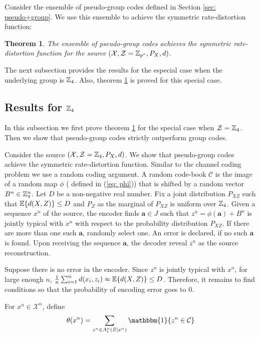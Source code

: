 \documentclass[conference]{IEEEtran}
\theoremstyle{plain}
\newtheorem{thm}{Theorem}
\theoremstyle{definition}
\theoremstyle{remark}
\begin{document}
Consider the ensemble of pseudo-group codes defined in Section \ref{sec: pseudo+group}. We use this ensemble to achieve the symmetric rate-distortion function:
\begin{thm}\label{thm: source coding pseudo group codes}
The ensemble of pseudo-group codes achieves the symmetric rate-distortion function for the source $(\mathcal{X},\mathcal{Z}=\mathbb{Z}_{p^r},P_X,d)$.
\end{thm}

The next subsection provides the results for the especial case when the underlying group is $\mathbb{Z}_4$. Also, theorem \ref{thm: source coding pseudo group codes} is proved for this special case.


\subsection{Results for $\mathbb{Z}_4$}
In this subsection we first prove theorem \ref{thm: source coding pseudo group codes} for the special case when $\mathcal{Z}=\mathbb{Z}_4$. Then we show that pseudo-group codes strictly outperform group codes. 

Consider the source $(\mathcal{X},\mathcal{Z}=\mathbb{Z}_4,P_X,d)$. We show that pseudo-group codes achieve the symmetric rate-distortion function. Similar to the channel coding problem we use a random coding argument. A random code-book $\mathcal{C}$ is the image of a random map $\phi$ ( defined in (\ref{eq: phi})) that is shifted by a random vector $B^n \in \mathbb{Z}_4^n$. Let $D$ be a non-negative real number. Fix a joint distribution $P_{XZ}$ such that $\mathbb{E}\{d(X,Z)\}\leq D$ and $P_{Z}$ as the marginal of $P_{XZ}$ is uniform over $\mathbb{Z}_4$.  Given a sequence $x^n$ of the source, the encoder finds $\mathbf{a}\in J$ such that $z^n=\phi(\mathbf{a})+B^n$ is jointly typical with $x^n$ with respect to the probability distribution $P_{XZ}$. If there are more than one such $\mathbf{a}$, randomly select one. An error is declared, if no such $\mathbf{a}$ is found.  Upon receiving the sequence $\mathbf{a}$, the decoder reveal $z^n$ as the source reconstruction.

Suppose there is no error in the encoder. Since $z^n$ is jointly typical with $x^n$, for large enough $n$, $\frac{1}{n}\sum _{i=1}^n d(x_i,z_i)\approx \mathbb{E}\{d(X,Z)\}\leq D$. Therefore, it remains to find conditions so that the probability of encoding error goes to $0$.

For $x^n\in \mathcal{X}^n$, define
 \begin{equation*}
 \theta(x^n)=\sum_{z^n \in A_{\epsilon}^n(Z|x^n)}\mathbbm{1}\{z^n \in \mathcal{C}\}
 \end{equation*}
\end{document}

